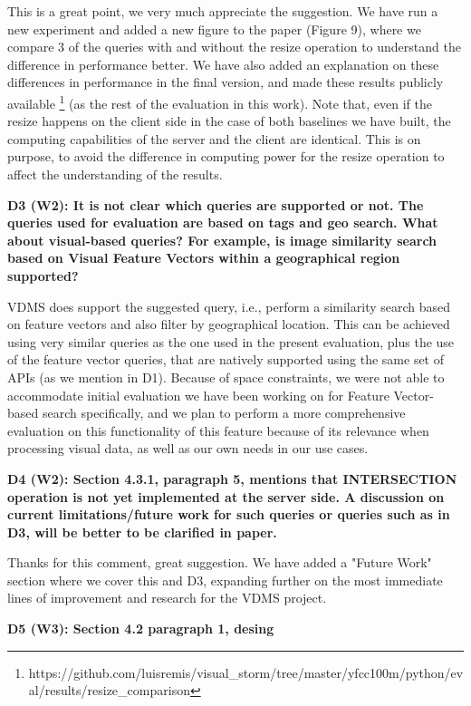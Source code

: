 \documentclass[11pt]{proposalnsf}
\begin{document}
This is a great point, we very much appreciate the suggestion.
We have run a new experiment and added a new figure to the paper (Figure 9),
where we compare 3 of the queries with and without the resize operation
to understand the difference in performance better.
We have also added an explanation on these differences in performance
in the final version, and made these results publicly available
\footnote{https://github.com/luisremis/visual\_storm/tree/master/yfcc100m/python/eval/results/resize\_comparison}
(as the rest of the evaluation in this work).
Note that, even if the resize happens on the client side in the case of both
baselines we have built, the computing capabilities of the server and the
client are identical.
This is on purpose, to avoid the difference in computing power for the
resize operation to affect the understanding of the results.

\bigskip
\noindent %
\textbf{
D3 (W2): It is not clear which queries are supported or not.
The queries used for evaluation are based on tags and geo search.
What about visual-based queries? For example, is image similarity search based
on Visual Feature Vectors within a geographical region supported?
}\bigskip

VDMS does support the suggested query, i.e., perform a similarity search based
on feature vectors and also filter by geographical location.
This can be achieved using very similar queries as the one used in
the present evaluation, plus the use of the feature vector queries,
that are natively supported using the same set of APIs (as we mention in D1).
Because of space constraints, we were not able to accommodate initial evaluation
we have been working on for Feature Vector-based search specifically,
and we plan to perform a more comprehensive evaluation on this functionality
of this feature because of its relevance when processing visual data, as well
as our own needs in our use cases.

\bigskip
\noindent %
\textbf{
D4 (W2): Section 4.3.1, paragraph 5, mentions that INTERSECTION operation is not
yet implemented at the server side.
A discussion on current limitations/future work for such queries or queries
such as in D3, will be better to be clarified in paper.
}\bigskip

Thanks for this comment, great suggestion.
We have added a "Future Work" section where we cover this and D3,
expanding further on the most immediate lines of improvement and
research for the VDMS project.

\bigskip
\noindent %
\textbf{
D5 (W3): Section 4.2 paragraph 1, desing
}\bigskip
\end{document}
